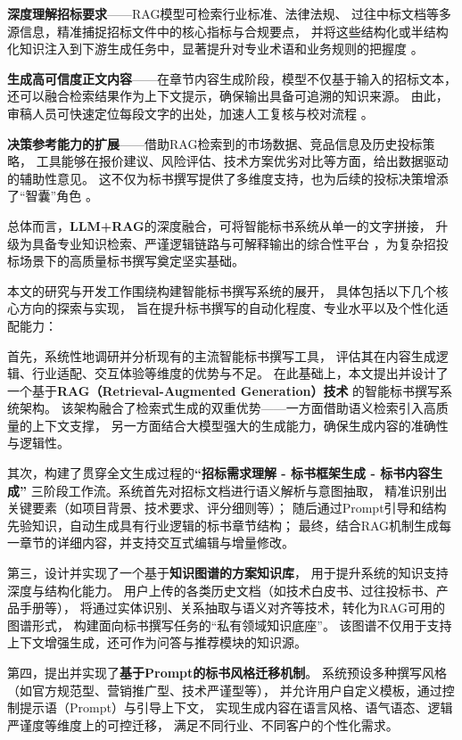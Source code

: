 \documentclass{xmu}
\begin{document}
{\bf 深度理解招标要求}——RAG模型可检索行业标准、法律法规、
过往中标文档等多源信息，精准捕捉招标文件中的核心指标与合规要点，
并将这些结构化或半结构化知识注入到下游生成任务中，显著提升对专业术语和业务规则的把握度 。

{\bf 生成高可信度正文内容}——在章节内容生成阶段，模型不仅基于输入的招标文本，
还可以融合检索结果作为上下文提示，确保输出具备可追溯的知识来源。
由此，审稿人员可快速定位每段文字的出处，加速人工复核与校对流程 。

{\bf 决策参考能力的扩展}——借助RAG检索到的市场数据、竞品信息及历史投标策略，
工具能够在报价建议、风险评估、技术方案优劣对比等方面，给出数据驱动的辅助性意见。
这不仅为标书撰写提供了多维度支持，也为后续的投标决策增添了“智囊”角色 。

总体而言，{\bf LLM+RAG}的深度融合，可将智能标书系统从单一的文字拼接，
升级为具备专业知识检索、严谨逻辑链路与可解释输出的综合性平台
，为复杂招投标场景下的高质量标书撰写奠定坚实基础。


本文的研究与开发工作围绕构建智能标书撰写系统的展开，
具体包括以下几个核心方向的探索与实现，
旨在提升标书撰写的自动化程度、专业水平以及个性化适配能力：

首先，系统性地调研并分析现有的主流智能标书撰写工具，
评估其在内容生成逻辑、行业适配、交互体验等维度的优势与不足。
在此基础上，本文提出并设计了一个基于{\bf RAG（Retrieval-Augmented Generation）技术}
的智能标书撰写系统架构。
该架构融合了检索式生成的双重优势——一方面借助语义检索引入高质量的上下文支撑，
另一方面结合大模型强大的生成能力，确保生成内容的准确性与逻辑性。

其次，构建了贯穿全文生成过程的{\bf “招标需求理解 - 标书框架生成 - 标书内容生成”}
三阶段工作流。系统首先对招标文档进行语义解析与意图抽取，
精准识别出关键要素（如项目背景、技术要求、评分细则等）；
随后通过Prompt引导和结构先验知识，自动生成具有行业逻辑的标书章节结构；
最终，结合RAG机制生成每一章节的详细内容，并支持交互式编辑与增量修改。

第三，设计并实现了一个基于{\bf 知识图谱的方案知识库}，
用于提升系统的知识支持深度与结构化能力。
用户上传的各类历史文档（如技术白皮书、过往投标书、产品手册等），
将通过实体识别、关系抽取与语义对齐等技术，转化为RAG可用的图谱形式，
构建面向标书撰写任务的“私有领域知识底座”。
该图谱不仅用于支持上下文增强生成，还可作为问答与推荐模块的知识源。

第四，提出并实现了{\bf 基于Prompt的标书风格迁移机制}。
系统预设多种撰写风格（如官方规范型、营销推广型、技术严谨型等），
并允许用户自定义模板，通过控制提示语（Prompt）与引导上下文，
实现生成内容在语言风格、语气语态、逻辑严谨度等维度上的可控迁移，
满足不同行业、不同客户的个性化需求。
\end{document}
